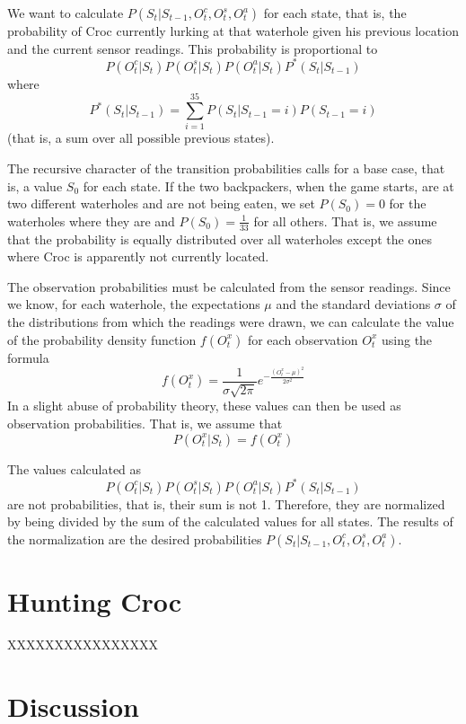 \documentclass[a4paper]{article}
\begin{document}
We want to calculate $P(S_t|S_{t-1}, O^c_t, O^s_t, O^a_t)$ for each state,
that is, the probability of Croc currently lurking at that waterhole
given his previous location and the current sensor readings. This probability
is proportional to
\begin{equation*}
P(O^c_t|S_t)P(O^s_t|S_t)P(O^a_t|S_t)P^*(S_t|S_{t-1})
\end{equation*}
where
\begin{equation*}
P^*(S_t|S_{t-1}) = \sum\limits_{i=1}^{35} P(S_t|S_{t-1}=i)P(S_{t-1}=i)  
\end{equation*}
(that is, a sum over all possible previous states). %

The recursive character of
the transition probabilities calls for a base case, that is, a value $S_0$ for
each state. If the two backpackers, when the game starts, are at two different
waterholes and are not being eaten, we set $P(S_0) = 0$ for the waterholes
where they are and $P(S_0) = \frac{1}{33}$ for all others. That is, we assume
that the probability is equally distributed over all waterholes except the
ones where Croc is apparently not currently located. %

The observation probabilities must be calculated from the sensor
readings. Since we know, for each waterhole, the expectations $\mu$ and the
standard deviations $\sigma$ of the distributions from which the readings were
drawn, we can calculate the value of the probability density function
$f(O^x_t)$ for each observation $O^x_t$ using the formula
\begin{equation*}
  f(O^x_t) = \frac{1}{\sigma \sqrt{2 \pi}}e^{-\frac{(O^x_t-\mu)^2}{2\sigma ^2}}
\end{equation*}
In a slight abuse of probability theory, these values can then be used as
observation probabilities. That is, we assume that
\begin{equation*}
  P(O^x_t|S_t) = f(O^x_t)
\end{equation*}

The values calculated as
\begin{equation*}
  P(O^c_t|S_t)P(O^s_t|S_t)P(O^a_t|S_t)P^*(S_t|S_{t-1})
\end{equation*}
are not probabilities, that is, their sum is not 1. Therefore, they are
normalized by being divided by the sum of the calculated values for all
states. The results of the normalization are the desired probabilities $P(S_t|S_{t-1}, O^c_t, O^s_t, O^a_t)$.

\section{Hunting Croc}
\label{hunt}

XXXXXXXXXXXXXXXX

\section{Discussion}
\end{document}
